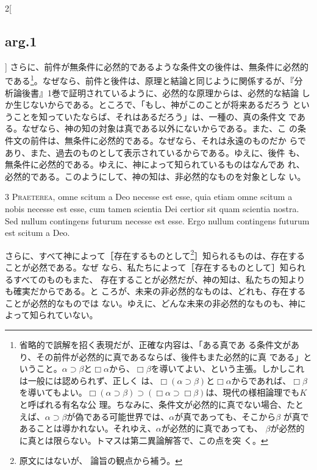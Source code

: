 \documentclass[paper=a4paper,fontsize=10pt,jafontsize=9pt,titlepage]{jlreq}
\begin{document}
\begin{paracol}{2}[\subsection{arg.1}]
さらに、前件が無条件に必然的であるような条件文の後件は、無条件に必然的
である\footnote{省略的で誤解を招く表現だが、正確な内容は、「ある真であ
る条件文があり、その前件が必然的に真であるならば、後件もまた必然的に真
である」ということ。$\alpha \supset \beta$と$\Box \alpha$から、$\Box
\beta$を導いてよい、という主張。しかしこれは一般には認められず、正しく
は、$\Box (\alpha \supset \beta)$と$\Box \alpha$からであれば、$\Box
\beta$を導いてもよい。$\Box (\alpha \supset \beta) \supset (\Box
\alpha \supset \Box \beta)$は、現代の様相論理でも$K$と呼ばれる有名な公
理。ちなみに、条件文が必然的に真でない場合、たとえば、$\alpha \supset
\beta$が偽である可能世界では、$\alpha$が真であっても、そこから$\beta$
が真であることは導かれない。それゆえ、$\alpha$が必然的に真であっても、
$\beta$が必然的に真とは限らない。トマスは第二異論解答で、この点を突
く。}。なぜなら、前件と後件は、原理と結論と同じように関係するが、『分
析論後書』1巻で証明されているように、必然的な原理からは、必然的な結論
しか生じないからである。ところで、「もし、神がこのことが将来あるだろう
ということを知っていたならば、それはあるだろう」は、一種の、真の条件文
である。なぜなら、神の知の対象は真である以外にないからである。また、こ
の条件文の前件は、無条件に必然的である。なぜなら、それは永遠のものだか
らであり、また、過去のものとして表示されているからである。ゆえに、後件
も、無条件に必然的である。ゆえに、神によって知られているものはなんであ
れ、必然的である。このようにして、神の知は、非必然的なものを対象としな
い。

\switchcolumn*

3 {\scshape Praeterea}, omne scitum a Deo necesse est esse, quia etiam
omne scitum a nobis necesse est esse, cum tamen scientia Dei certior
sit quam scientia nostra. Sed nullum contingens futurum necesse est
esse. Ergo nullum contingens futurum est scitum a Deo.

\switchcolumn

さらに、すべて神によって［存在するものとして\footnote{原文にはないが、
論旨の観点から補う。}］知られるものは、存在することが必然である。なぜ
なら、私たちによって［存在するものとして］知られるすべてのものもまた、
存在することが必然だが、神の知は、私たちの知よりも確実だからである。と
ころが、未来の非必然的なものは、どれも、存在することが必然的なものでは
ない。ゆえに、どんな未来の非必然的なものも、神によって知られていない。

\switchcolumn*[\subsection{s.c.}]


\end{paracol}
\end{document}

